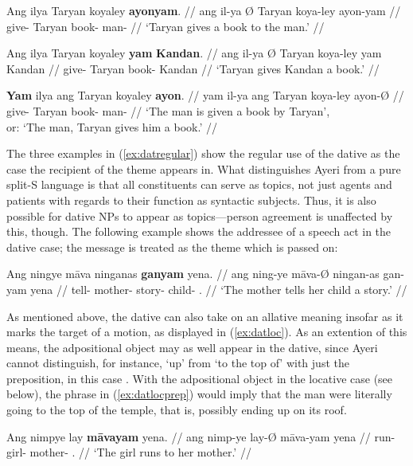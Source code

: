 \pex\label{ex:datregular}
\a\begingl
	\gla Ang ilya {} Taryan koyaley \textbf{ayonyam}. //
	\glb ang il-ya Ø Taryan koya-ley ayon-yam //
	\glc \AgtT{} give-\TsgM{} \Top{} Taryan book-\PargI{} 
		man-\Dat{} //
	\glft `Taryan gives a book to the man.' //
\endgl

\a\begingl
	\gla Ang ilya {} Taryan koyaley \textbf{yam} \textbf{Kandan}. //
	\glb ang il-ya Ø Taryan koya-ley yam Kandan //
	\glc \AgtT{} give-\TsgM{} \Top{} Taryan book-\PargI{} \Dat{} Kandan //
	\glft `Taryan gives Kandan a book.' //
\endgl

\a\begingl
	\gla \textbf{Yam} ilya ang Taryan koyaley \textbf{ayon}. //
	\glb yam il-ya ang Taryan koya-ley ayon-Ø //
	\glc \DatT{} give-\TsgM{} \Aarg{} Taryan book-\PargI{} man-\Top{} //
	\glft `The man is given a book by Taryan',\\
		or: `The man, Taryan gives him a book.' //
\endgl

\xe

The three examples in (\ref{ex:datregular}) show the regular use of the dative 
as the case the recipient of the theme appears in. What distinguishes Ayeri 
from a pure split-S language is that all constituents can serve as topics, not 
just agents and patients with regards to their function as syntactic subjects. 
Thus, it is also possible for dative NPs to appear as topics---person 
agreement is unaffected by this, though. The following example shows the 
addressee of a speech act in the dative case; the message is treated as the 
theme which is passed on:

\ex
\begingl
	\gla Ang ningye māva ninganas \textbf{ganyam} yena. //
	\glb ang ning-ye māva-Ø ningan-as gan-yam yena //
	\glc \AgtT{} tell-\TsgF{} mother-\Top{} story-\Parg{} 
		child-\Dat{} \TsgF{}.\Gen{} //
	\glft `The mother tells her child a story.' //
\endgl
\xe

As mentioned above, the dative can also take on an allative meaning insofar as
it marks the target of a motion, as displayed in (\ref{ex:datloc}). As an
extention of this means, the adpositional object may as well appear in the
dative, since Ayeri cannot distinguish, for instance, `up' from `to the top of'
with just the preposition, in this case . With the
adpositional object in the locative case (see below), the phrase in
(\ref{ex:datlocprep}) would imply that the man were literally going to the top
of the temple, that is, possibly ending up on its roof.

\pex
\a\label{ex:datloc}\begingl
	\gla Ang nimpye lay \textbf{māvayam} yena. //
	\glb ang nimp-ye lay-Ø māva-yam yena //
	\glc \AgtT{} run-\TsgF{} girl-\Top{} mother-\Dat{} \TsgF{}.\Gen{} //
	\glft `The girl runs to her mother.' //
\endgl

